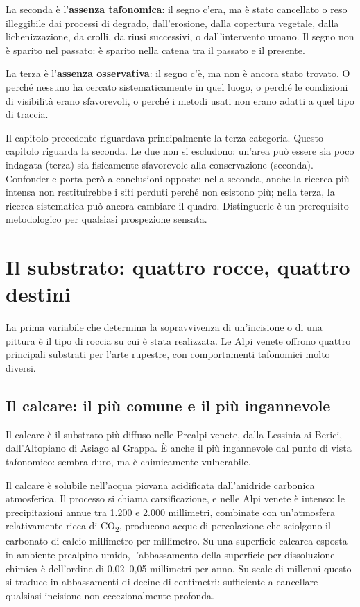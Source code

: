 La seconda è l'\textbf{assenza tafonomica}: il segno c'era, ma è stato cancellato o reso illeggibile dai processi di degrado, dall'erosione, dalla copertura vegetale, dalla lichenizzazione, da crolli, da riusi successivi, o dall'intervento umano. Il segno non è sparito nel passato: è sparito nella catena tra il passato e il presente.

La terza è l'\textbf{assenza osservativa}: il segno c'è, ma non è ancora stato trovato. O perché nessuno ha cercato sistematicamente in quel luogo, o perché le condizioni di visibilità erano sfavorevoli, o perché i metodi usati non erano adatti a quel tipo di traccia.

Il capitolo precedente riguardava principalmente la terza categoria. Questo capitolo riguarda la seconda. Le due non si escludono: un'area può essere sia poco indagata (terza) sia fisicamente sfavorevole alla conservazione (seconda). Confonderle porta però a conclusioni opposte: nella seconda, anche la ricerca più intensa non restituirebbe i siti perduti perché non esistono più; nella terza, la ricerca sistematica può ancora cambiare il quadro. Distinguerle è un prerequisito metodologico per qualsiasi prospezione sensata.

\section{Il substrato: quattro rocce, quattro destini}

La prima variabile che determina la sopravvivenza di un'incisione o di una pittura è il tipo di roccia su cui è stata realizzata. Le Alpi venete offrono quattro principali substrati per l'arte rupestre, con comportamenti tafonomici molto diversi.

\subsection{Il calcare: il più comune e il più ingannevole}

Il calcare è il substrato più diffuso nelle Prealpi venete, dalla Lessinia ai Berici, dall'Altopiano di Asiago al Grappa. È anche il più ingannevole dal punto di vista tafonomico: sembra duro, ma è chimicamente vulnerabile.

Il calcare è solubile nell'acqua piovana acidificata dall'anidride carbonica atmosferica. Il processo si chiama carsificazione, e nelle Alpi venete è intenso: le precipitazioni annue tra 1.200 e 2.000 millimetri, combinate con un'atmosfera relativamente ricca di CO\textsubscript{2}, producono acque di percolazione che sciolgono il carbonato di calcio millimetro per millimetro. Su una superficie calcarea esposta in ambiente prealpino umido, l'abbassamento della superficie per dissoluzione chimica è dell'ordine di 0,02--0,05 millimetri per anno. Su scale di millenni questo si traduce in abbassamenti di decine di centimetri: sufficiente a cancellare qualsiasi incisione non eccezionalmente profonda.

